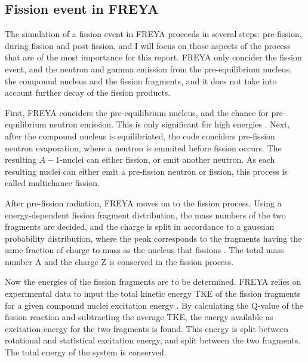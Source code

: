 \documentclass[]{article}
\begin{document}
\subsection{Fission event in FREYA}
\label{Fission_FREYA}

The simulation of a fission event in FREYA proceeds in several steps: pre-fission, during fission and post-fission, and I will focus on those aspects of the process that are of the most importance for this report. FREYA only concider the fission event, and the neutron and gamma emission from the pre-equilibrium nucleus, the compound nucleus and the fission fragments, and it does not take into account further decay of the fission products.

First, FREYA conciders the pre-equilibrium nucleus, and the chance for pre-equilibrium neutron emission. This is only significant for high energies \cite{FREYAusemanual}. Next, after the compound nucleus is equilibriated, the code conciders pre-fission neutron evaporation, where a neutron is emmited before fission occurs. The resulting $A-1$-nuclei can either fission, or emit another neutron. As each resulting nuclei can either emit a pre-fission neutron or fission, this process is called multichance fission.

After pre-fission radiation, FREYA moves on to the fission process. Using a energy-dependent fission fragment distribution, the mass numbers of the two fragments are decided, and the charge is split in accordance to a gaussian probability distribution, where the peak corresponds to the fragments having the same fraction of charge to mass as the nucleus that fissions \cite{FREYAusemanual}. The total mass number A and the charge Z is conserved in the fission process.

Now the energies of the fission fragments are to be determined. FREYA relies on experimental data to input the total kinetic energy TKE of the fission fragments for a given compound nuclei excitation energy \cite{FREYAusemanual}. By calculating the Q-value of the fission reaction and subtracting the average TKE, the energy available as excitation energy for the two fragments is found. This energy is split between rotational and statistical excitation energy, and split between the two fragments. The total energy of the system is conserved. 
\end{document}
